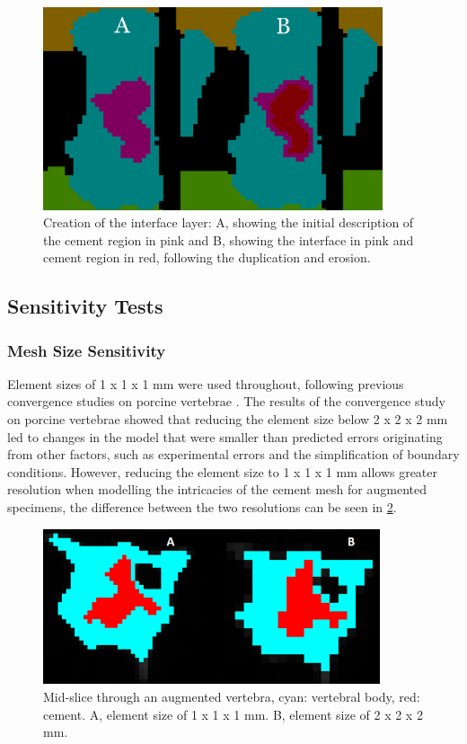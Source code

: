 \begin{figure}[ht!]
\centering
\includegraphics[width=10cm]{images/interface_creation.png}
\caption[Depiction of the yielding material interface creation]{Creation of the interface layer: A, showing the initial description of the cement region in pink and B, showing the interface in pink and cement region in red, following the duplication and erosion.}
\label{fig:interfacecreation}
\end{figure}

\subsection{Sensitivity Tests}\label{sensitivity-tests}

\subsubsection{Mesh Size Sensitivity}\label{mesh-size-sensitivity}

Element sizes of 1 x 1 x 1 mm were used throughout, following previous
convergence studies on porcine vertebrae \cite{Jones2007}. The results of the
convergence study on porcine vertebrae showed that reducing the element size
below 2 x 2 x 2 mm led to changes in the model that were smaller than predicted
errors originating from other factors, such as experimental errors and the
simplification of boundary conditions.  However, reducing the element size to 1
x 1 x 1 mm allows greater resolution when modelling the intricacies of the
cement mesh for augmented specimens, the difference between the two resolutions
can be seen in \cref{fig:vertslice}.

\begin{figure}[ht!]

\centering
\includegraphics[width=3.90994in,height=1.80208in]{images/res_comp.png}
\caption{Mid-slice through an augmented vertebra, cyan: vertebral body, red:
cement. A, element size of 1 x 1 x 1 mm. B, element size of 2 x 2 x
2 mm.}
\label{fig:vertslice}
\end{figure}


